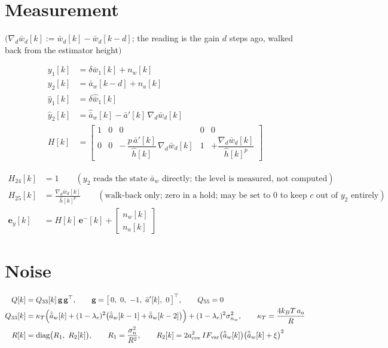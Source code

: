 \documentclass[11pt,a4paper,fontset=none]{ctexart}
\newcommand{\ba}{\bar{a}}
\newcommand{\bw}{\bar{w}}
\newcommand{\ap}{\ba'}
\newcommand{\ah}{\hat{\ba}_w}
\newcommand{\hh}{\hat{h}}
\begin{document}
\section{Measurement}

$\bigl(\nabla_d\bw_d[k] := \bw_d[k] - \bw_d[k-d]$; the reading is the gain $d$ steps ago, walked back from the estimator height$\bigr)$

\begin{align*}
y_1[k]      &= \delta\bw_1[k] + n_w[k] \\
y_2[k]      &= \ba_w[k-d] + n_a[k] \\
\hat y_1[k] &= \delta\hat{\bw}_1[k] \\
\hat y_2[k] &= \ah[k] - \ap[k]\,\nabla_d\bw_d[k] \\[4pt]
H[k]        &= \begin{bmatrix} 1 & 0 & 0 & 0 & 0 \\[2pt]
               0 & 0 & -\,\dfrac{p\,\ap[k]}{\hh[k]}\,\nabla_d\bw_d[k] & 1 & +\dfrac{\nabla_d\bw_d[k]}{\hh[k]^{p}} \end{bmatrix}
\end{align*}

\begin{align*}
H_{24}[k] &= 1 \qquad(y_2 \text{ reads the state } \ba_w \text{ directly; the level is measured, not computed}) \\
H_{25}[k] &= \frac{\nabla_d\bw_d[k]}{\hh[k]^{p}} \qquad(\text{walk-back only; zero in a hold; may be set to } 0 \text{ to keep } c \text{ out of } y_2 \text{ entirely}) \\
\mathbf{e}_y[k] &= H[k]\,\mathbf{e}^{-}[k] + \begin{bmatrix} n_w[k] \\ n_a[k] \end{bmatrix}
\end{align*}

\section{Noise}

\begin{align*}
Q[k]      &= Q_{33}[k]\,\mathbf{g}\,\mathbf{g}^{\top}, \qquad \mathbf{g} = \bigl[\,0,\ 0,\ -1,\ \ap[k],\ 0\,\bigr]^{\top}, \qquad Q_{55} = 0 \\
Q_{33}[k] &= \kappa_T\Bigl(\ah[k] + (1-\lambda_c)^{2}\bigl(\ah[k-1] + \ah[k-2]\bigr)\Bigr) + (1-\lambda_c)^{2}\sigma^{2}_{n_w},
\qquad \kappa_T = \frac{4k_BT\,a_o}{R} \\
R[k]      &= \mathrm{diag}\bigl(R_1,\ R_2[k]\bigr), \qquad R_1 = \frac{\sigma^{2}_{n}}{R^{2}}, \qquad
R_2[k] = 2a_{\mathrm{cov}}^{2}\,IF_{\mathrm{var}}\bigl(\ah[k]\bigr)\bigl(\ah[k] + \xi\bigr)^{2}
\end{align*}
\end{document}
